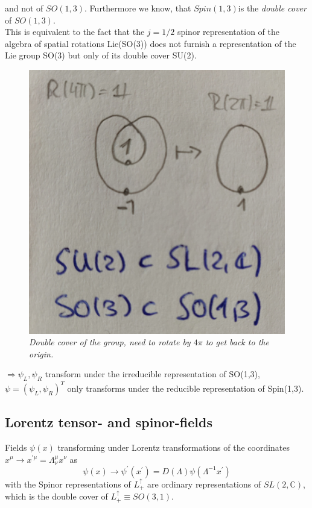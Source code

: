 and not of $SO(1,3)$. Furthermore we know, that $Spin(1,3)$is the  \emph{double cover} of $SO(1,3)$.\\
This is equivalent to the fact that the $j=1/2$ spinor representation of the algebra of spatial rotations Lie(SO(3)) does not furnish a representation of the Lie group SO(3) but only of its double cover SU(2).\\
\begin{figure}[h]
	\centering
	\includegraphics[width=0.7\linewidth]{gfx/doublecoverDiracSpinor}
	\caption{\itshape Double cover of the group, need to rotate by $4\pi$ to get back to the origin.}
	\label{fig:doublecoverdiracspinor}
\end{figure}

$\Rightarrow \psi_L, \psi_R$ transform under the irreducible representation of SO(1,3), $\psi=(\psi_L, \psi_R)^T$ only transforms under the reducible representation of Spin(1,3).

\subsection{Lorentz tensor- and spinor-fields}
Fields $\psi(x)$ transforming under Lorentz transformations of the coordinates $x^\mu \rightarrow x^{\prime \mu} = \Lambda^\mu_\nu x^\nu$ as
\begin{equation}
\label{eq:fieldsLorentztrafo}
	\psi(x) \rightarrow \psi^\prime(x^\prime) = D(\Lambda) \psi(\Lambda^{-1}x^\prime)
\end{equation}
with the 
Spinor representations of $L^\uparrow_+$ are ordinary representations of $SL(2, \mathbb{C})$, which is the double cover of $L^\uparrow_+ ≡ SO(3, 1)$.





